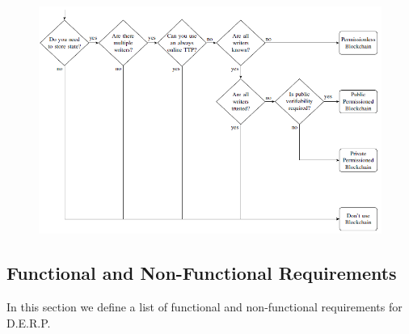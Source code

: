 \documentclass[12pt,a4paper,oneside]{article}
\theoremstyle{definition}
\begin{document}
\begin{figure}[H]
	\centering
	\includegraphics[width=0.75\linewidth]{figures/should-use-blockhain.png}
\end{figure}

%

\subsection{Functional and Non-Functional Requirements}

In this section we define a list of functional and non-functional requirements for D.E.R.P.
\end{document}

